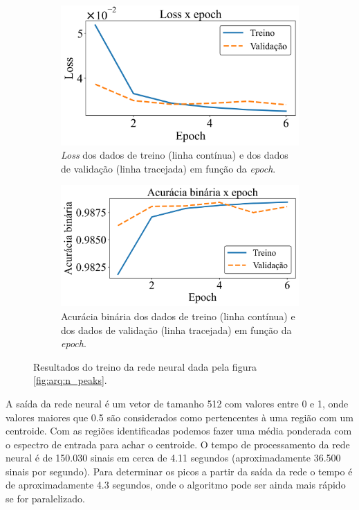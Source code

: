 \documentclass[a4paper,12pt,oneside]{book}
\begin{document}
\begin{figure}[H]
\centering
    \begin{subfigure}[t]{0.49\textwidth}
        \centering
        \includegraphics[scale=0.42]{figs/n_peaks_loss.png}
        \caption{\textit{Loss} dos dados de treino (linha contínua) e dos dados de validação (linha tracejada) em função da \textit{epoch}.}
        \label{subfig:n_peaks_loss}
    \end{subfigure}%
    \hfill
    \begin{subfigure}[t]{0.46\textwidth}
        \centering
        \includegraphics[scale=0.42]{figs/n_peaks_metric.png}
        \caption{Acurácia binária dos dados de treino (linha contínua) e dos dados de validação (linha tracejada) em função da \textit{epoch}.}
        \label{subfig:n_peaks_metric}
    \end{subfigure}
\caption{Resultados do treino da rede neural dada pela figura \ref{fig:arq:n_peaks}.}
\label{fig:n_peaks_results}
\end{figure}

\par A saída da rede neural é um vetor de tamanho 512 com valores entre 0 e 1, onde valores maiores que 0.5 são considerados como pertencentes à uma região com um centroide. Com as regiões identificadas podemos fazer uma média ponderada com o espectro de entrada para achar o centroide. O tempo de processamento da rede neural é de 150.030 sinais em cerca de 4.11 segundos (aproximadamente 36.500 sinais por segundo). Para determinar os picos a partir da saída da rede o tempo é de aproximadamente 4.3 segundos, onde o algoritmo pode ser ainda mais rápido se for paralelizado.
\end{document}
